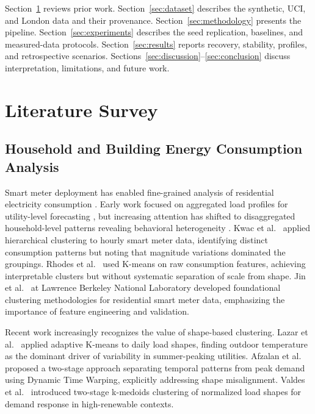 \documentclass[11pt,a4paper]{article}
\begin{document}
Section~\ref{sec:literature} reviews prior work. Section~\ref{sec:dataset} describes the synthetic, UCI, and London data and their provenance. Section~\ref{sec:methodology} presents the pipeline. Section~\ref{sec:experiments} describes the seed replication, baselines, and measured-data protocols. Section~\ref{sec:results} reports recovery, stability, profiles, and retrospective scenarios. Sections~\ref{sec:discussion}--\ref{sec:conclusion} discuss interpretation, limitations, and future work.

\section{Literature Survey}
\label{sec:literature}

\subsection{Household and Building Energy Consumption Analysis}

Smart meter deployment has enabled fine-grained analysis of residential electricity consumption \cite{kwac2014household,rhodes2014clustering}. Early work focused on aggregated load profiles for utility-level forecasting \cite{haben2016analysis}, but increasing attention has shifted to disaggregated household-level patterns revealing behavioral heterogeneity \cite{lazar2021investigating,jin2016loadshape}. Kwac et al.~\cite{kwac2014household} applied hierarchical clustering to hourly smart meter data, identifying distinct consumption patterns but noting that magnitude variations dominated the groupings. Rhodes et al.~\cite{rhodes2014clustering} used K-means on raw consumption features, achieving interpretable clusters but without systematic separation of scale from shape. Jin et al.~\cite{jin2016loadshape} at Lawrence Berkeley National Laboratory developed foundational clustering methodologies for residential smart meter data, emphasizing the importance of feature engineering and validation.

Recent work increasingly recognizes the value of shape-based clustering. Lazar et al.~\cite{lazar2021investigating} applied adaptive K-means to daily load shapes, finding outdoor temperature as the dominant driver of variability in summer-peaking utilities. Afzalan et al.~\cite{afzalan2020twostage} proposed a two-stage approach separating temporal patterns from peak demand using Dynamic Time Warping, explicitly addressing shape misalignment. Valdes et al.~\cite{valdes2021smart} introduced two-stage k-medoids clustering of normalized load shapes for demand response in high-renewable contexts.
\end{document}
